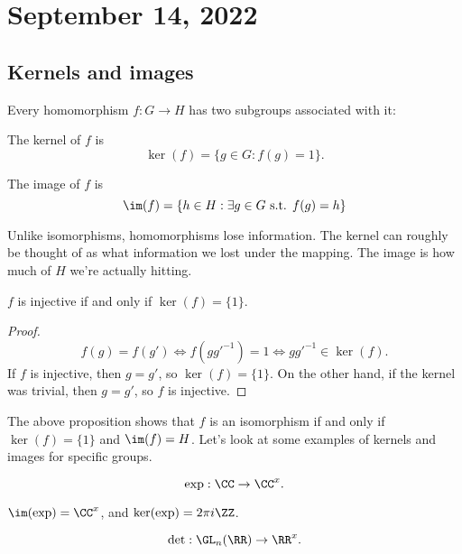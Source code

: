 \section{September 14, 2022}

\subsection{Kernels and images}

Every homomorphism $f: G\rightarrow H$ has two subgroups associated with it: 

\begin{definition}

The \ac{kernel} of $f$ is 
\[\ker(f) = \{g\in G : f(g)=1\}.\]
\end{definition}

\begin{definition}

The \ac{image} of $f$ is 
\[\im(f) = \{h\in H : \exists g\in G \text{ s.t. } f(g)=h\}\]
\end{definition}

Unlike isomorphisms, homomorphisms lose information. The kernel can roughly be thought of as what information we lost under the mapping. The image is how much of $H$ we're actually hitting. 

\begin{theorem}
\proplabel

$f$ is injective if and only if $\ker(f)=\{1\}$. 
\end{theorem}
\begin{proof}
\[f(g)=f(g')\iff f(gg'^{-1})=1\iff gg'^{-1}\in \ker(f).\]
If $f$ is injective, then $g=g'$, so $\ker(f)=\{1\}$. On the other hand, if the kernel was trivial, then $g=g'$, so $f$ is injective. 
\end{proof}

The above proposition shows that $f$ is an isomorphism if and only if $\ker(f)=\{1\}$ and $\im(f)=H$. Let's look at some examples of kernels and images for specific groups. 

\begin{example}
\exlabel
\[\text{exp}: \CC\rightarrow \CC^{x}.\]
\end{example}

$\im(\text{exp})=\CC^{x}$, and $\ker(\text{exp}) = 2\pi i\ZZ$. 

\begin{example}
\exlabel
\[\det: \GL_n(\RR)\rightarrow \RR^x.\]
\end{example}

